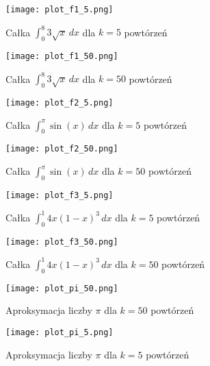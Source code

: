 \documentclass{article}
\begin{document}
\begin{figure}[h]
    \centering
    \texttt{[image: plot\_f1\_5.png]}
    \caption{Całka \( \int_{0}^{8} 3 \sqrt{x} \, dx \) dla \(k = 5\) powtórzeń}
\end{figure}

\begin{figure}[h]
    \centering
    \texttt{[image: plot\_f1\_50.png]}
    \caption{Całka \( \int_{0}^{8} 3 \sqrt{x} \, dx \) dla \(k = 50\) powtórzeń}
\end{figure}

\begin{figure}[h]
    \centering
    \texttt{[image: plot\_f2\_5.png]}
    \caption{Całka \( \int_{0}^{\pi} \sin(x) \, dx \) dla \(k = 5\) powtórzeń}
\end{figure}

\begin{figure}[h]
    \centering
    \texttt{[image: plot\_f2\_50.png]}
    \caption{Całka \( \int_{0}^{\pi} \sin(x) \, dx \) dla \(k = 50\) powtórzeń}
\end{figure}

\begin{figure}[h]
    \centering
    \texttt{[image: plot\_f3\_5.png]}
    \caption{Całka \( \int_{0}^{1} 4x(1 - x)^3 \, dx \) dla \(k = 5\) powtórzeń}
\end{figure}

\begin{figure}[h]
    \centering
    \texttt{[image: plot\_f3\_50.png]}
    \caption{Całka \( \int_{0}^{1} 4x(1 - x)^3 \, dx \) dla \(k = 50\) powtórzeń}
\end{figure}

\begin{figure}[h]
    \centering
    \texttt{[image: plot\_pi\_50.png]}
    \caption{Aproksymacja liczby \(\pi\) dla \(k = 50\) powtórzeń}
\end{figure}

\begin{figure}[h]
    \centering
    \texttt{[image: plot\_pi\_5.png]}
    \caption{Aproksymacja liczby \(\pi\) dla \(k = 5\) powtórzeń}
\end{figure}
\end{document}
